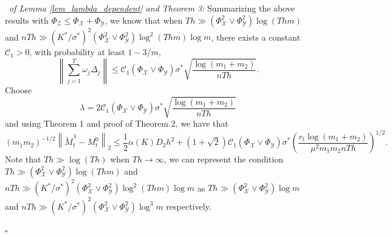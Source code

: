 \documentclass[12pt]{article}
\newenvironment{pf}{{\noindent\it Proof}\ }{\hfill $\square$\par}
\begin{document}
\begin{pf}{\it of Lemma \ref{lem_lambda_dependent} and Theorem 3:}
  Summarizing the above results with $\Phi_\mathcal{Z} \le \Phi_\mathcal{X}+\Phi_\mathcal{Y}$, we know that when $Th \gg (\Phi^2_{\mathcal{X}}\vee \Phi_\mathcal{Y}^2 )\log (Thm)$ and $nTh \gg \left(K^*/\sigma^*\right)^2(\Phi_\mathcal{X}^2\vee \Phi_{\mathcal{Y}}^2)\log^2(Thm)\log m$, there exists a constant $\mathcal{C}_1>0$, with probability at least $1-3/m$,
  \begin{equation*}
  \left\|\sum_{j=1}^T \omega_j \Delta_j\right\| \le \mathcal{C}_1 (\Phi_{\mathcal{X}}\vee \Phi_{\mathcal{Y}})\sigma^* \sqrt{\frac{\log (m_1+m_2)}{nTh}}.
  \end{equation*}
  Choose $$\lambda = 2\mathcal{C}_1(\Phi_{\mathcal{X}}\vee \Phi_{\mathcal{Y}})\sigma^* \sqrt{\frac{\log (m_1+m_2)}{nTh}}$$
  and using Theorem 1 and proof of Theorem 2, we have that
  \begin{equation*}
      (m_1m_2)^{-1/2}\left\|\widetilde{M}_t^\lambda - M_t^0\right\|_2 \le \frac{1}{2}\alpha(K) D_2 h^2 + (1+\sqrt{2})\mathcal{C}_1(\Phi_{\mathcal{X}}\vee \Phi_{\mathcal{Y}}) \sigma^*\left(\frac{r_t\log(m_1+m_2)}{\mu^2m_1m_2nTh}\right)^{1/2}.
  \end{equation*}
  Note that $Th \gg \log(Th)$ when $Th\rightarrow\infty$, we can represent the condition $Th \gg (\Phi^2_{\mathcal{X}}\vee \Phi_\mathcal{Y}^2 )\log (Thm)$ and $nTh \gg \left(K^*/\sigma^*\right)^2(\Phi_\mathcal{X}^2\vee \Phi_{\mathcal{Y}}^2)\log^2(Thm)\log m$ as $Th \gg (\Phi^2_{\mathcal{X}}\vee \Phi_\mathcal{Y}^2 )\log m$ and $nTh \gg \left(K^*/\sigma^*\right)^2(\Phi_\mathcal{X}^2\vee \Phi_{\mathcal{Y}}^2)\log^3 m$  respectively.
  
\end{pf}
\end{document}

